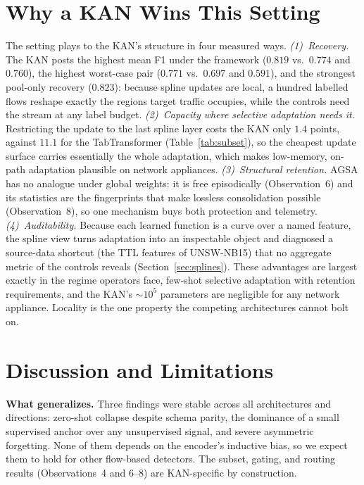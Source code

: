 \documentclass[10pt, conference, letterpaper]{IEEEtran}
\begin{document}
\section{Why a KAN Wins This Setting}\label{sec:whykan}
The setting plays to the KAN's structure in four measured ways.
\emph{(1)~Recovery.} The KAN posts the highest mean F1 under the
framework ($0.819$ vs.\ $0.774$ and $0.760$), the highest worst-case
pair ($0.771$ vs.\ $0.697$ and $0.591$), and the strongest pool-only
recovery ($0.823$): because spline updates are local, a hundred
labelled flows reshape exactly the regions target traffic occupies,
while the controls need the stream at any label budget.
\emph{(2)~Capacity where selective adaptation needs it.} Restricting
the update to the last spline layer costs the KAN only $1.4$ points,
against $11.1$ for the TabTransformer (Table~\ref{tab:subset}), so the
cheapest update surface carries essentially the whole adaptation,
which makes low-memory, on-path adaptation plausible on network
appliances.
\emph{(3)~Structural retention.} AGSA has no analogue under global
weights: it is free episodically (Observation~6) and its statistics
are the fingerprints that make lossless consolidation possible
(Observation~8), so one mechanism buys both protection and telemetry.
\emph{(4)~Auditability.} Because each learned function is a curve over
a named feature, the spline view turns adaptation into an inspectable
object and diagnosed a source-data shortcut (the TTL features of
UNSW-NB15) that no aggregate metric of the controls reveals
(Section~\ref{sec:splines}). These advantages are largest exactly in
the regime operators face, few-shot selective adaptation with
retention requirements, and the KAN's ${\sim}10^5$ parameters are
negligible for any network appliance. Locality is the one property the
competing architectures cannot bolt on.

\section{Discussion and Limitations}\label{sec:discussion}
\textbf{What generalizes.} Three findings were stable across all
architectures and directions: zero-shot collapse despite schema
parity, the dominance of a small supervised anchor over any
unsupervised signal, and severe asymmetric forgetting. None of them
depends on the encoder's inductive bias, so we expect them to hold for
other flow-based detectors. The subset, gating, and routing results
(Observations~4 and 6--8) are KAN-specific by construction.
\end{document}
